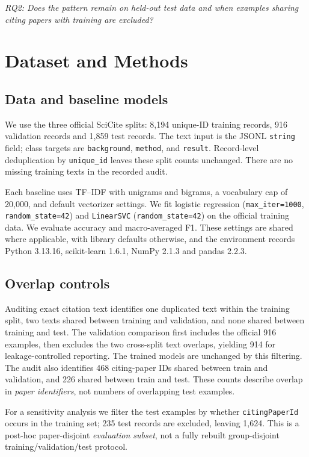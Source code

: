 \documentclass[11pt]{article}
\begin{document}
\emph{RQ2: Does the pattern remain on held-out test data and when examples sharing citing papers with training are excluded?}

\section{Dataset and Methods}
\subsection{Data and baseline models}
We use the three official SciCite splits: 8,194 unique-ID training records, 916 validation records and 1,859 test records. The text input is the JSONL \texttt{string} field; class targets are \texttt{background}, \texttt{method}, and \texttt{result}. Record-level deduplication by \texttt{unique\_id} leaves these split counts unchanged. There are no missing training texts in the recorded audit.

Each baseline uses TF--IDF with unigrams and bigrams, a vocabulary cap of 20,000, and default vectorizer settings. We fit logistic regression (\texttt{max\_iter=1000}, \texttt{random\_state=42}) and \texttt{LinearSVC} (\texttt{random\_state=42}) on the official training data. We evaluate accuracy and macro-averaged F1. These settings are shared where applicable, with library defaults otherwise, and the environment records Python 3.13.16, scikit-learn 1.6.1, NumPy 2.1.3 and pandas 2.2.3.

\subsection{Overlap controls}
Auditing exact citation text identifies one duplicated text within the training split, two texts shared between training and validation, and none shared between training and test. The validation comparison first includes the official 916 examples, then excludes the two cross-split text overlaps, yielding 914 for leakage-controlled reporting. The trained models are unchanged by this filtering. The audit also identifies 468 citing-paper IDs shared between train and validation, and 226 shared between train and test. These counts describe overlap in \emph{paper identifiers}, not numbers of overlapping test examples.

For a sensitivity analysis we filter the test examples by whether \texttt{citingPaperId} occurs in the training set; 235 test records are excluded, leaving 1,624. This is a post-hoc paper-disjoint \emph{evaluation subset}, not a fully rebuilt group-disjoint training/validation/test protocol.
\end{document}
